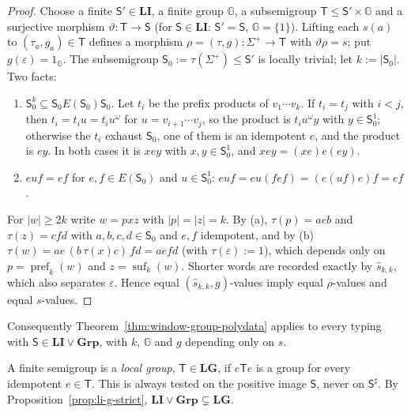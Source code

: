 \documentclass[11pt]{article}
\numberwithin{equation}{section}
\theoremstyle{plain}
\theoremstyle{definition}
\theoremstyle{remark}
\newcommand{\eps}{\varepsilon}
\begin{document}
\begin{proof}
Choose a finite $\mathsf S'\in\mathbf{LI}$, a finite group ${\mathbb G}$, a subsemigroup
$\mathsf T\le \mathsf S'\times {\mathbb G}$ and a surjective morphism $\vartheta:\mathsf T\to\mathsf S$ (for
$\mathsf S\in\mathbf{LI}$: $\mathsf S'=\mathsf S$, ${\mathbb G}=\{1\}$).  Lifting each $s(a)$ to
$(\tau_a,g_a)\in \mathsf T$ defines a morphism $\rho=(\tau,g):\Sigma^+\to \mathsf T$ with
$\vartheta\rho=s$; put $g(\eps)=1_{\mathbb G}$.  The subsemigroup $\mathsf S_0:=\tau(\Sigma^+)\le \mathsf S'$ is
locally trivial; let $k:=|\mathsf S_0|$.  Two facts:
\begin{enumerate}[label=\textup{(\alph*)},leftmargin=*]
\item $\mathsf S_0^k\subseteq \mathsf S_0E(\mathsf S_0)\mathsf S_0$.  Let $t_i$ be the prefix products of
$v_1\cdots v_k$.  If $t_i=t_j$ with $i<j$, then $t_i=t_iu=t_iu^\omega$ for
$u=v_{i+1}\cdots v_j$, so the product is $t_iu^\omega y$ with $y\in \mathsf S_0^1$;
otherwise the $t_i$ exhaust $\mathsf S_0$, one of them is an idempotent $e$, and the
product is $ey$.  In both cases it is $xey$ with $x,y\in \mathsf S_0^1$, and
$xey=(xe)e(ey)$.
\item $euf=ef$ for $e,f\in E(\mathsf S_0)$ and $u\in \mathsf S_0^1$: $euf=eu(fef)=(e(uf)e)f=ef$.
\end{enumerate}
For $|w|\ge2k$ write $w=pxz$ with $|p|=|z|=k$.  By (a),
$\tau(p)=aeb$ and $\tau(z)=cfd$ with $a,b,c,d\in \mathsf S_0$ and $e,f$ idempotent, and
by (b) $\tau(w)=ae\,(b\,\tau(x)c)\,fd=aefd$ (with $\tau(\eps):=1$), which
depends only on $p=\operatorname{pref}_k(w)$ and $z=\operatorname{suf}_k(w)$.
Shorter words are recorded exactly by $\widehat s_{k,k}$, which also separates
$\eps$.  Hence equal $(\widehat s_{k,k},g)$-values imply equal $\rho$-values and
equal $s$-values.
\end{proof}

Consequently Theorem~\ref{thm:window-group-polydata} applies to every typing with
$\mathsf S\in\mathbf{LI}\vee\mathbf{Grp}$, with $k$, ${\mathbb G}$ and $g$ depending only
on $s$.

A finite semigroup is a \emph{local group}, $\mathsf T\in\mathbf{LG}$, if $e\mathsf Te$ is a
group for every idempotent $e\in\mathsf T$.  This is always tested on the positive image
$\mathsf S$, never on $\mathsf S^\sharp$.  By
Proposition~\ref{prop:li-g-strict}, $\mathbf{LI}\vee\mathbf{Grp}\subsetneq\mathbf{LG}$.
\end{document}
